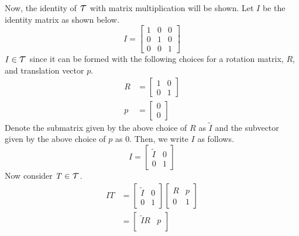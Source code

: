 \documentclass[11pt]{article}
\newcommand\Tau{\scalerel*{\tau}{T}}
\begin{document}
\begin{enumerate}[leftmargin=0.3in]
\begin{enumerate}
Now, the identity of $\Tau$ with matrix multiplication will be shown. Let $\mathit{I}$ be the identity matrix as shown below.
   \begin{equation*}
       \mathit{I} = \begin{bmatrix}
    1 & 0 & 0 \\
    0 & 1 & 0 \\
    0 & 0 & 1
    \end{bmatrix}
   \end{equation*}
   $\mathit{I} \in \Tau$ since it can be formed with the following choices for a rotation matrix, $\mathit{R}$, and translation vector $\mathit{p}$. 
   \begin{align*}
       \mathit{R} &= \begin{bmatrix}
        1 & 0 \\
        0 & 1
    \end{bmatrix} \\
       \mathit{p} &= \begin{bmatrix}
           0 \\
           0
       \end{bmatrix}
   \end{align*}
   Denote the submatrix given by the above choice of $\mathit{R}$ as $\tilde{\mathit{I}}$ and the subvector given by the above choice of $\mathit{p}$ as $\mathit{0}$. Then, we write $\mathit{I}$ as follows.
   \begin{equation*}
       \mathit{I} = \begin{bmatrix}
               \tilde{\mathit{I}} & \mathit{0} \\
               0 & 1
       \end{bmatrix}
   \end{equation*}
   Now consider $\mathit{T} \in \Tau$.
   \begin{align*}
       \mathit{I} \mathit{T} &= \begin{bmatrix}
               \tilde{\mathit{I}} & \mathit{0} \\
               0 & 1
               \end{bmatrix} \begin{bmatrix}
               \mathit{R} & \mathit{p} \\
               0 & 1
           \end{bmatrix} \\ 
            &= \begin{bmatrix}
                \tilde{\mathit{I}} \mathit{R} & \mathit{p} \\

\end{bmatrix}
\end{align*}
\end{enumerate}
\end{enumerate}
\end{document}
